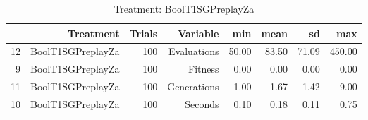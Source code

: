 \begin{table}[ht]
\centering
\begin{tabular}{rrrrrrrr}
  \hline
 & Treatment & Trials & Variable & min & mean & sd & max \\ 
  \hline
12 & BoolT1SGPreplayZa & 100 & Evaluations & 50.00 & 83.50 & 71.09 & 450.00 \\ 
  9 & BoolT1SGPreplayZa & 100 & Fitness & 0.00 & 0.00 & 0.00 & 0.00 \\ 
  11 & BoolT1SGPreplayZa & 100 & Generations & 1.00 & 1.67 & 1.42 & 9.00 \\ 
  10 & BoolT1SGPreplayZa & 100 & Seconds & 0.10 & 0.18 & 0.11 & 0.75 \\ 
   \hline
\end{tabular}
\caption{Treatment: BoolT1SGPreplayZa} 
\end{table}

